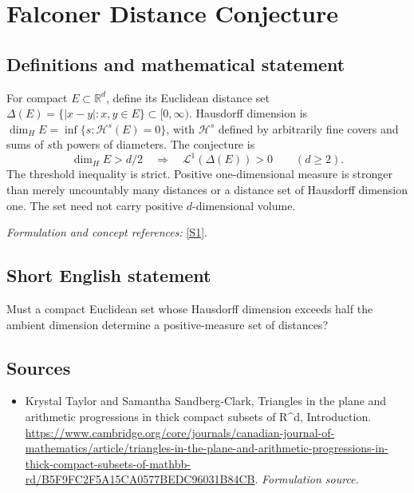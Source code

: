 \documentclass[11pt]{article}
\begin{document}
\section*{\texorpdfstring{Falconer Distance Conjecture}{Falconer Distance Conjecture}}\label{30001063}
\subsection{Definitions and mathematical statement}
For compact $E\subset{\mathbb{R}}^d$, define its Euclidean distance set
$\Delta(E)=\{|x-y|:x,y\in E\}\subset[0,\infty)$. Hausdorff dimension is
$\dim_H E=\inf\{s:\mathcal H^s(E)=0\}$, with $\mathcal H^s$ defined by arbitrarily fine covers and sums of $s$th powers of diameters. The conjecture is
\[
 \dim_H E>d/2\quad\Longrightarrow\quad \mathcal L^1(\Delta(E))>0
 \qquad(d\ge2).
\]
The threshold inequality is strict. Positive one-dimensional measure is stronger than merely uncountably many distances or a distance set of Hausdorff dimension one. The set need not carry positive $d$-dimensional volume.
\par\smallskip\textit{Formulation and concept references:} \href{https://www.cambridge.org/core/journals/canadian-journal-of-mathematics/article/triangles-in-the-plane-and-arithmetic-progressions-in-thick-compact-subsets-of-mathbb-rd/B5F9FC2F5A15CA0577BEDC96031B84CB}{[S1]}.

\subsection{Short English statement}
Must a compact Euclidean set whose Hausdorff dimension exceeds half the ambient dimension determine a positive-measure set of distances?
\subsection{Sources}
\begin{itemize}
\item[S1]Krystal Taylor and Samantha Sandberg-Clark, Triangles in the plane and arithmetic progressions in thick compact subsets of R\textasciicircum{}d, Introduction.
\url{https://www.cambridge.org/core/journals/canadian-journal-of-mathematics/article/triangles-in-the-plane-and-arithmetic-progressions-in-thick-compact-subsets-of-mathbb-rd/B5F9FC2F5A15CA0577BEDC96031B84CB}.
\textit{Formulation source.}
\end{itemize}
\end{document}
